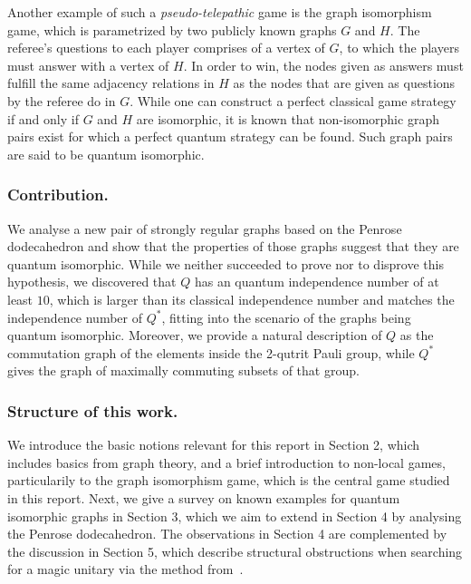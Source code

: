 Another example of such a \emph{pseudo-telepathic} game is the graph isomorphism game,
which is parametrized by two publicly known graphs $G$ and $H$.
The referee’s questions to each player comprises of a vertex of $G$,
to which the players must answer with a vertex of $H$. 
In order to win, the nodes given as answers must fulfill the same adjacency relations in
$H$ as the nodes that are given as questions by the referee do in $G$.
While one can construct a perfect classical game strategy if and only if $G$ and $H$ are isomorphic, 
it is known that non-isomorphic graph pairs exist for which a perfect quantum strategy can be found.
Such graph pairs are said to be quantum isomorphic.


\subsubsection{Contribution.}
We analyse a new pair of strongly regular graphs based on the Penrose dodecahedron
and show that the properties of those graphs suggest that they are quantum isomorphic.
While we neither succeeded to prove nor to disprove this hypothesis,
we discovered that $Q$ has an quantum independence number of at least $10$,
which is larger than its classical independence number and matches 
the independence number of $Q^*$,
fitting into the scenario of the graphs being quantum isomorphic.
Moreover, we provide a natural description of $Q$ as the commutation graph of 
the elements inside the 2-qutrit Pauli group,
while $Q^*$ gives the graph of maximally commuting subsets of that group.

\subsubsection{Structure of this work.}
We introduce the basic notions relevant for this report in Section 2,
which includes basics from graph theory, and a brief introduction to non-local games,
particularily to the graph isomorphism game, which is the central game studied in this report.
Next, we give a survey on known examples for quantum isomorphic graphs in Section 3,
which we aim to extend in Section 4 by analysing the Penrose dodecahedron.
The observations in Section 4 are complemented by the discussion in Section 5,
which describe structural obstructions when searching for a magic unitary via
the method from~\cite{ALCO_2024__7_2_515_0}.
